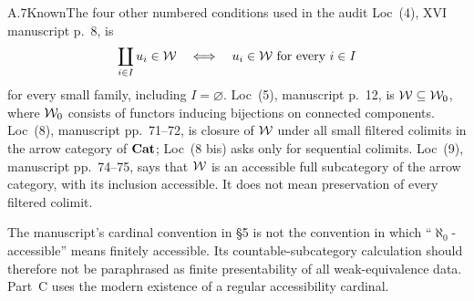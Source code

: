 \begin{claim}{A.7}{Known}{The four other numbered conditions used in the audit}
Loc~(4), XVI manuscript p.~8, is
\[
\coprod_{i\in I}u_i\in\mathcal{W}\quad\Longleftrightarrow\quad
u_i\in\mathcal{W}\text{ for every }i\in I
\]
for every small family, including $I=\varnothing$. Loc~(5), manuscript p.~12, is $\mathcal{W}\subseteq\mathcal{W}_0$, where $\mathcal{W}_0$ consists of functors inducing bijections on connected components. Loc~(8), manuscript pp.~71--72, is closure of $\mathcal{W}$ under all small filtered colimits in the arrow category of $\mathbf{Cat}$; Loc~(8 bis) asks only for sequential colimits. Loc~(9), manuscript pp.~74--75, says that $\mathcal{W}$ is an accessible full subcategory of the arrow category, with its inclusion accessible. It does not mean preservation of every filtered colimit.
\end{claim}
The manuscript's cardinal convention in \S5 is not the convention in which ``$\aleph_0$-accessible'' means finitely accessible. Its countable-subcategory calculation should therefore not be paraphrased as finite presentability of all weak-equivalence data. Part~C uses the modern existence of a regular accessibility cardinal.

